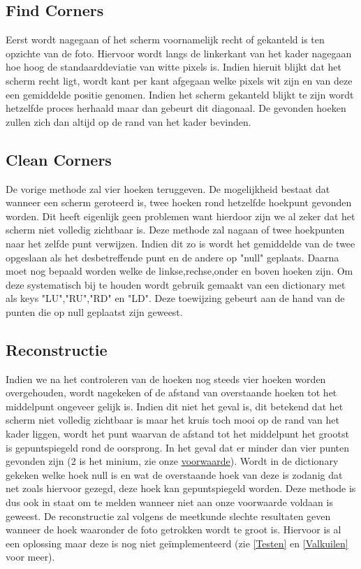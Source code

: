 \subsection{Find Corners}
Eerst wordt nagegaan of het scherm voornamelijk recht of gekanteld is ten opzichte van de foto. Hiervoor wordt langs de linkerkant van het kader nagegaan hoe hoog de standaarddeviatie van witte pixels is. Indien hieruit blijkt dat het scherm recht ligt, wordt kant per kant afgegaan welke pixels wit zijn en van deze een gemiddelde positie genomen. Indien het scherm gekanteld blijkt te zijn wordt hetzelfde proces herhaald maar dan gebeurt dit diagonaal. De gevonden hoeken zullen zich dan altijd op de rand van het kader bevinden. 

\subsection{Clean Corners}
De vorige methode zal vier hoeken teruggeven. De mogelijkheid bestaat dat wanneer een scherm geroteerd is, twee hoeken rond hetzelfde hoekpunt gevonden worden. Dit heeft eigenlijk geen problemen want hierdoor zijn we al zeker dat het scherm niet volledig zichtbaar is. Deze methode zal nagaan of twee hoekpunten naar het zelfde punt verwijzen. Indien dit zo is wordt het gemiddelde van de twee opgeslaan als het desbetreffende punt en de andere op "null" geplaats. Daarna moet nog bepaald worden welke de linkse,rechse,onder en boven hoeken zijn. Om deze systematisch bij te houden wordt gebruik gemaakt van een dictionary met als keys "LU","RU","RD"  \space en "LD". Deze toewijzing gebeurt aan de hand van de punten die op null geplaatst zijn geweest.

\subsection{Reconstructie} \label{reconstructie}
Indien we na het controleren van de hoeken nog steeds vier hoeken worden overgehouden, wordt nagekeken of de afstand van overstaande hoeken tot het middelpunt ongeveer gelijk is. Indien dit niet het geval is, dit betekend dat het scherm niet volledig zichtbaar is maar het kruis toch mooi op de rand van het kader liggen, wordt het punt waarvan de afstand tot het middelpunt het grootst is gepuntspiegeld rond de oorsprong.
In het geval dat er minder dan vier punten gevonden zijn (2 is het minium, zie onze \hyperref[voorwaarde]{voorwaarde}). Wordt in de dictionary gekeken welke hoek null is en wat  de overstaande hoek van deze is zodanig dat net zoals hiervoor gezegd, deze hoek kan gepuntspiegeld worden. Deze methode is dus ook in staat om te melden wanneer niet aan onze voorwaarde voldaan is geweest. De reconstructie zal volgens de meetkunde slechte resultaten geven wanneer de hoek waaronder de foto getrokken wordt te groot is. Hiervoor is al een oplossing maar deze is nog niet geïmplementeerd (zie \ref{Testen} en \ref{Valkuilen} voor meer).


